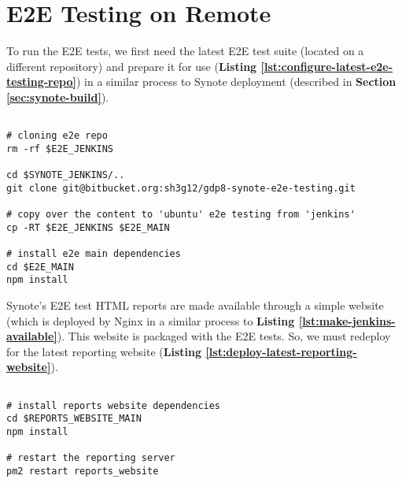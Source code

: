 \section{E2E Testing on Remote}
\label{subsec:e2e-testing-on-remote}

To run the E2E tests, we first need the latest E2E test suite (located on a different repository) and prepare it for use (\textbf{Listing \ref{lst:configure-latest-e2e-testing-repo}}) in a similar process to Synote deployment (described in \textbf{Section \ref{sec:synote-build}}).\\

\begin{listing}[H]
\begin{verbatim}

# cloning e2e repo
rm -rf $E2E_JENKINS

cd $SYNOTE_JENKINS/..
git clone git@bitbucket.org:sh3g12/gdp8-synote-e2e-testing.git

# copy over the content to 'ubuntu' e2e testing from 'jenkins'
cp -RT $E2E_JENKINS $E2E_MAIN

# install e2e main dependencies
cd $E2E_MAIN
npm install

\end{verbatim}
\label{lst:configure-latest-e2e-testing-repo}
\end{listing}

Synote's E2E test HTML reports are made available through a simple website (which is deployed by Nginx in a similar process to \textbf{Listing \ref{lst:make-jenkins-available}}). This website is packaged with the E2E tests. So, we must redeploy for the latest reporting website (\textbf{Listing \ref{lst:deploy-latest-reporting-website}}).\\

\begin{listing}[H]
\begin{verbatim}

# install reports website dependencies
cd $REPORTS_WEBSITE_MAIN
npm install

# restart the reporting server
pm2 restart reports_website

\end{verbatim}
\label{lst:deploy-latest-reporting-website}
\end{listing}

